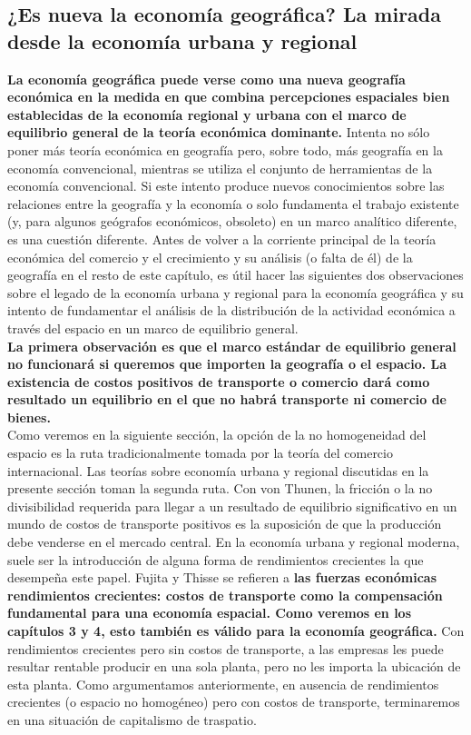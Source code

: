 \subsection{¿Es nueva la economía geográfica? La mirada desde la economía urbana y regional}
\textbf{La economía geográfica puede verse como una nueva geografía económica en la medida en que combina percepciones espaciales bien establecidas de la economía regional y urbana con el marco de equilibrio general de la teoría económica dominante.} Intenta no sólo poner más teoría económica en geografía pero, sobre todo, más geografía en la economía convencional, mientras se utiliza el conjunto de herramientas de la economía convencional. Si este intento produce nuevos conocimientos sobre las relaciones entre la geografía y la economía o solo fundamenta el trabajo existente (y, para algunos geógrafos económicos, obsoleto) en un marco analítico diferente, es una cuestión diferente. Antes de volver a la corriente principal de la teoría económica del comercio y el crecimiento y su análisis (o falta de él) de la geografía en el resto de este capítulo, es útil hacer las siguientes dos observaciones sobre el legado de la economía urbana y regional para la economía geográfica y su intento de fundamentar el análisis de la distribución de la actividad económica a través del espacio en un marco de equilibrio general.\\
\textbf{La primera observación es que el marco estándar de equilibrio general no funcionará si queremos que importen la geografía o el espacio. La existencia de costos positivos de transporte o comercio dará como resultado un equilibrio en el que no habrá transporte ni comercio de bienes.}\\
Como veremos en la siguiente sección, la opción de la no homogeneidad del espacio es la ruta tradicionalmente tomada por la teoría del comercio internacional. Las teorías sobre economía urbana y regional discutidas en la presente sección toman la segunda ruta. Con von Thunen, la fricción o la no divisibilidad requerida para llegar a un resultado de equilibrio significativo en un mundo de costos de transporte positivos es la suposición de que la producción debe venderse en el mercado central. En la economía urbana y regional moderna, suele ser la introducción de alguna forma de rendimientos crecientes la que desempeña este papel. Fujita y Thisse se refieren a \textbf{las fuerzas económicas rendimientos crecientes: costos de transporte como la compensación fundamental para una economía espacial. Como veremos en los capítulos 3 y 4, esto también es válido para la economía geográfica.} Con rendimientos crecientes pero sin costos de transporte, a las empresas les puede resultar rentable producir en una sola planta, pero no les importa la ubicación de esta planta. Como argumentamos anteriormente, en ausencia de rendimientos crecientes (o espacio no homogéneo) pero con costos de transporte, terminaremos en una situación de capitalismo de traspatio.\\
